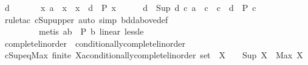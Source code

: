\begin{isabellebody}
\ d\isanewline
\ \ \ \ \isamarkupfalse%
\ {}{\isacharcolon}{\kern0pt}\ {\isachardoublequoteopen}{\isasymforall}x{\isachardot}{\kern0pt}\ a\ {\isasymle}\ x\ {\isasymand}\ x\ {\isacharless}{\kern0pt}\ d\ {\isasymlongrightarrow}\ P\ x{\isachardoublequoteclose}\isanewline
\ \ \ \ \isamarkupfalse%
\ {\isachardoublequoteopen}d\ {\isasymle}\ Sup\ {\isacharbraceleft}{\kern0pt}d{\isachardot}{\kern0pt}\ {\isasymforall}c{\isachardot}{\kern0pt}\ a\ {\isasymle}\ c\ {\isasymand}\ c\ {\isacharless}{\kern0pt}\ d\ {\isasymlongrightarrow}\ P\ c{\isacharbraceright}{\kern0pt}{\isachardoublequoteclose}\isanewline
\ \ \ \ \ \ \isamarkupfalse%
\ {\isacharparenleft}{\kern0pt}rule{\isacharunderscore}{\kern0pt}tac\ cSup{\isacharunderscore}{\kern0pt}upper{\isacharcomma}{\kern0pt}\ auto\ simp{\isacharcolon}{\kern0pt}\ bdd{\isacharunderscore}{\kern0pt}above{\isacharunderscore}{\kern0pt}def{\isacharparenright}{\kern0pt}\isanewline
\ \ \ \ \ \ \ \ \ {\isacharparenleft}{\kern0pt}metis\ {\isacartoucheopen}a{\isacharless}{\kern0pt}b{\isacartoucheclose}\ {\isacartoucheopen}{\isasymnot}\ P\ b{\isacartoucheclose}\ linear\ less{\isacharunderscore}{\kern0pt}le{\isacharparenright}{\kern0pt}\isanewline
{}\isamarkupfalse%
%
\endisatagproof
{\isafoldproof}%
%
\isadelimproof
\isanewline
%
\endisadelimproof
\isanewline
{}\isamarkupfalse%
\isanewline
\isanewline
{}\isamarkupfalse%
\ complete{\isacharunderscore}{\kern0pt}linorder\ {\isacharless}{\kern0pt}\ conditionally{\isacharunderscore}{\kern0pt}complete{\isacharunderscore}{\kern0pt}linorder\isanewline
%
\isadelimproof
\ \ %
\endisadelimproof
%
\isatagproof
\isacommand{{\isachardot}{\kern0pt}{\isachardot}{\kern0pt}}\isamarkupfalse%
%
\endisatagproof
{\isafoldproof}%
%
\isadelimproof
\isanewline
%
\endisadelimproof
\isanewline
{}\isamarkupfalse%
\ cSup{\isacharunderscore}{\kern0pt}eq{\isacharunderscore}{\kern0pt}Max{\isacharcolon}{\kern0pt}\ {\isachardoublequoteopen}finite\ {\isacharparenleft}{\kern0pt}X{\isacharcolon}{\kern0pt}{\isacharcolon}{\kern0pt}{\isacharprime}{\kern0pt}a{\isacharcolon}{\kern0pt}{\isacharcolon}{\kern0pt}conditionally{\isacharunderscore}{\kern0pt}complete{\isacharunderscore}{\kern0pt}linorder\ set{\isacharparenright}{\kern0pt}\ {\isasymLongrightarrow}\ X\ {\isasymnoteq}\ {\isacharbraceleft}{\kern0pt}{\isacharbraceright}{\kern0pt}\ {\isasymLongrightarrow}\ Sup\ X\ {\isacharequal}{\kern0pt}\ Max\ X{\isachardoublequoteclose}\isanewline
%
\isadelimproof
\ \ %
\endisadelimproof
%
\isatagproof
{}\isamarkupfalse%

\end{isabellebody}
